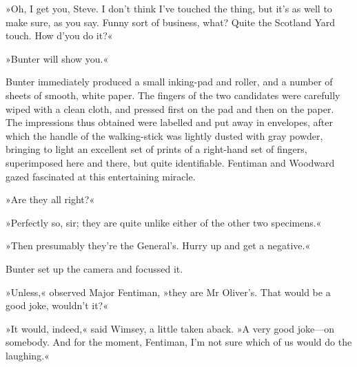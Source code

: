 »Oh, I get you, Steve. I don't think I've touched the thing, but it's as well to make sure, as you say. Funny sort of business, what? Quite the Scotland Yard touch. How d'you do it?«

»Bunter will show you.«

Bunter immediately produced a small inking-pad and roller, and a number of sheets of smooth, white paper. The fingers of the two candidates were carefully wiped with a clean cloth, and pressed first on the pad and then on the paper. The impressions thus obtained were labelled and put away in envelopes, after which the handle of the walking-stick was lightly dusted with gray powder, bringing to light an excellent set of prints of a right-hand set of fingers, superimposed here and there, but quite identifiable. Fentiman and Woodward gazed fascinated at this entertaining miracle.

»Are they all right?«

»Perfectly so, sir; they are quite unlike either of the other two specimens.«

»Then presumably they're the General's. Hurry up and get a negative.«

Bunter set up the camera and focussed it.

»Unless,« observed Major Fentiman, »they are Mr Oliver's. That would be a good joke, wouldn't it?«

»It would, indeed,« said Wimsey, a little taken aback. »A very good joke\allowbreak---\allowbreak on somebody. And for the moment, Fentiman, I'm not sure which of us would do the laughing.«

